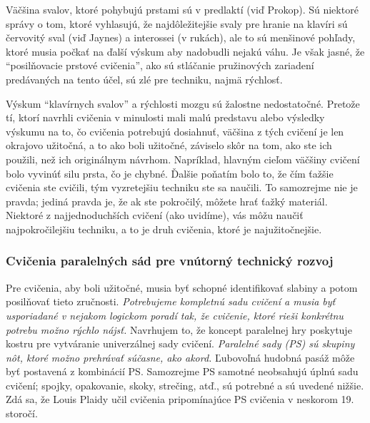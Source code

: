 Väčšina svalov, ktoré pohybujú prstami sú v predlaktí (viď Prokop). Sú niektoré správy o tom, ktoré vyhlasujú, že najdôležitejšie svaly pre hranie na klavíri sú červovitý sval (viď Jaynes) a interossei (v rukách), ale to sú menšinové pohľady, ktoré musia počkať na ďalší výskum aby nadobudli nejakú váhu. Je však jasné, že “posilňovacie prstové cvičenia”, ako sú stláčanie pružinových zariadení predávaných na tento účel, sú zlé pre techniku, najmä rýchlosť.

Výskum “klavírnych svalov” a rýchlosti mozgu sú žalostne nedostatočné. Pretože tí, ktorí navrhli cvičenia v minulosti mali malú predstavu alebo výsledky výskumu na to, čo cvičenia potrebujú dosiahnuť, väčšina z tých cvičení je len okrajovo užitočná, a to ako boli užitočné, záviselo skôr na tom, ako ste ich použili, než ich originálnym návrhom. Napríklad, hlavným cieľom väčšiny cvičení bolo vyvinúť silu prsta, čo je chybné. Ďalšie poňatím bolo to, že čím ťažšie cvičenia ste cvičili, tým vyzretejšiu techniku ste sa naučili. To samozrejme nie je pravda; jediná pravda je, že ak ste pokročilý, môžete hrať ťažký materiál. Niektoré z najjednoduchších cvičení (ako uvidíme), vás môžu naučiť najpokročilejšiu techniku, a to je druh cvičenia, ktoré je najužitočnejšie.

\subsubsection{Cvičenia paralelných sád pre vnútorný technický rozvoj}
Pre cvičenia, aby boli užitočné, musia byť schopné identifikovať slabiny a potom posilňovať tieto zručnosti. \emph{Potrebujeme kompletnú sadu cvičení a musia byť usporiadané v nejakom logickom poradí tak, že cvičenie, ktoré rieši konkrétnu potrebu možno rýchlo nájsť.} Navrhujem to, že koncept paralelnej hry poskytuje kostru pre vytváranie univerzálnej sady cvičení. \emph{Paralelné sady (PS) sú skupiny nôt, ktoré možno prehrávať súčasne, ako akord.} Ľubovoľná hudobná pasáž môže byť postavená z kombinácií PS. Samozrejme PS samotné neobsahujú úplnú sadu cvičení; spojky, opakovanie, skoky, strečing, atď., sú potrebné a sú uvedené nižšie. Zdá sa, že Louis Plaidy učil cvičenia pripomínajúce PS cvičenia v neskorom 19. storočí.

